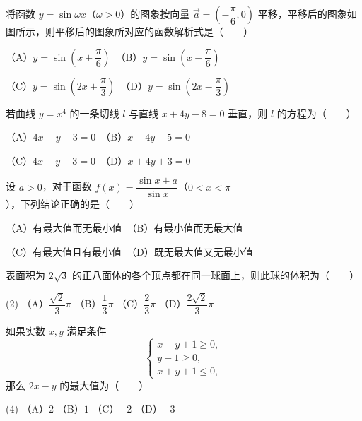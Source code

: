\begin{question}
将函数 $y=\sin\omega x$（$\omega>0$）的图象按向量 $\vec a=\left(-\dfrac{\pi}{6},0\right)$ 平移，平移后的图象如图所示，则平移后的图象所对应的函数解析式是\mbox{（　　）}
\nopagebreak[4]
\begin{center}\end{center}
\nopagebreak[4]
（A）$y=\sin\left(x+\dfrac{\pi}{6}\right)$　（B）$y=\sin\left(x-\dfrac{\pi}{6}\right)$

（C）$y=\sin\left(2x+\dfrac{\pi}{3}\right)$　（D）$y=\sin\left(2x-\dfrac{\pi}{3}\right)$

\end{question}
\begin{question}
若曲线 $y=x^4$ 的一条切线 $l$ 与直线 $x+4y-8=0$ 垂直，则 $l$ 的方程为\mbox{（　　）}

（A）$4x-y-3=0$　（B）$x+4y-5=0$

（C）$4x-y+3=0$　（D）$x+4y+3=0$

\end{question}
\begin{question}
设 $a>0$，对于函数 $f(x)=\dfrac{\sin x+a}{\sin x}$（$0<x<\pi$），下列结论正确的是\mbox{（　　）}

（A）有最大值而无最小值　（B）有最小值而无最大值

（C）有最大值且有最小值　（D）既无最大值又无最小值

\end{question}
\begin{question}
表面积为 $2\sqrt{3}$ 的正八面体的各个顶点都在同一球面上，则此球的体积为\mbox{（　　）}

\begin{gkopts}(2)
\task （A）$\dfrac{\sqrt{2}}{3}\pi$
\task （B）$\dfrac{1}{3}\pi$
\task （C）$\dfrac{2}{3}\pi$
\task （D）$\dfrac{2\sqrt{2}}{3}\pi$
\end{gkopts}

\end{question}
\begin{question}
如果实数 $x,y$ 满足条件
\nopagebreak[4]
\[
\begin{cases}
x-y+1\geqslant0,\\
y+1\geqslant0,\\
x+y+1\leqslant0,
\end{cases}
\]
那么 $2x-y$ 的最大值为\mbox{（　　）}

\begin{gkopts}(4)
\task （A）$2$
\task （B）$1$
\task （C）$-2$
\task （D）$-3$
\end{gkopts}

\end{question}
